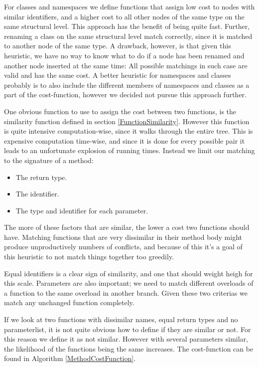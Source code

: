 \documentclass[11pt]{article}
\begin{document}
For classes and namespaces we define functions that assign low cost to nodes with similar identifiers, and a higher cost to all other nodes of the same type on the same structural level. This approach has the benefit of being quite fast. Further, renaming a class on the same structural level match correctly, since it is matched to another node of the same type. A drawback, however, is that given this heuristic, we have no way to know what to do if a node has been renamed and another node inserted at the same time: All possible matchings in such case are valid and has the same cost. A better heuristic for namespaces and classes probably is to also include the different members of namespaces and classes as a part of the cost-function, however we decided not pursue this approach further.

One obvious function to use to assign the cost between two functions, is the similarity function defined in section \ref{FunctionSimilarity}. However this function is quite intensive computation-wise, since it walks through the entire tree. This is expensive computation time-wise, and since it is done for every possible pair it leads to an unfortunate explosion of running times. Instead we limit our matching to the signature of a method:

\begin{itemize}
    \item The return type.
    \item The identifier.
    \item The type and identifier for each parameter.
\end{itemize}

The more of these factors that are similar, the lower a cost two functions should have. Matching functions that are very dissimilar in their method body might produce unproductively numbers of conflicts, and because of this it's a goal of this heuristic to not match things together too greedily.

Equal identifiers is a clear sign of similarity, and one that should weight heigh for this scale. Parameters are also important; we need to match different overloads of a function to the same overload in another branch. Given these two criterias we match any unchanged function completely.

If we look at two functions with dissimilar names, equal return types and no parameterlist, it is not quite obvious how to define if they are similar or not. For this reason we define it as not similar. However with several parameters similar, the likelihood of the functions being the same increases.  The cost-function can be found in Algorithm \ref{MethodCostFunction}.
\end{document}

